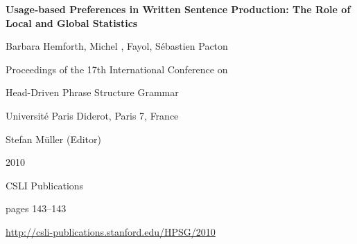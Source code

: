 \documentclass[a4paper,11pt]{article}
\begin{document}
\begin{center}
  {\huge\bf Usage-based Preferences in Written Sentence
 Production: The Role of Local and Global Statistics\par}

  \bigskip

  {\LARGE Barbara Hemforth, Michel , Fayol, S\'{e}bastien Pacton\par}

  \vspace*{3\bigskipamount}

  Proceedings of the 17th International Conference on\par Head-Driven Phrase Structure Grammar

  \bigskip

  Universit\'{e} Paris Diderot, Paris 7, France

  \medskip

  Stefan Müller (Editor)

  \medskip

  2010

  \medskip

  CSLI Publications

  \medskip

  pages 143--143

  \medskip

  \url{http://csli-publications.stanford.edu/HPSG/2010}
\end{center}

\newpage

        
\end{document}
